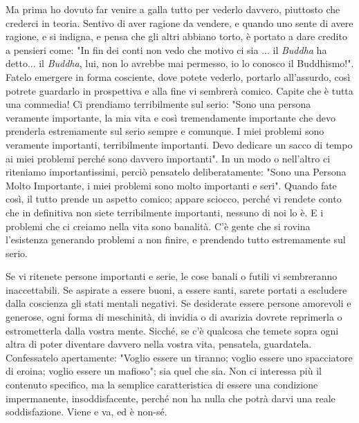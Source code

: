 Ma prima ho dovuto far venire a galla tutto per vederlo davvero,
piuttosto che crederci in teoria. Sentivo di aver ragione da vendere, e
quando uno sente di avere ragione, e si indigna, e pensa che gli altri
abbiano torto, è portato a dare credito a pensieri come: "In fin dei
conti non vedo che motivo ci sia ... il \textit{Buddha} ha detto... il \textit{Buddha},
lui, non lo avrebbe mai permesso, io lo conosco il Buddhismo!". Fatelo
emergere in forma cosciente, dove potete vederlo, portarlo all'assurdo,
così potrete guardarlo in prospettiva e alla fine vi sembrerà comico.
Capite che è tutta una commedia! Ci prendiamo terribilmente sul serio:
"Sono una persona veramente importante, la mia vita e così tremendamente
importante che devo prenderla estremamente sul serio sempre e comunque.
I miei problemi sono veramente importanti, terribilmente importanti.
Devo dedicare un sacco di tempo ai miei problemi perché sono davvero
importanti". In un modo o nell'altro ci riteniamo importantissimi,
perciò pensatelo deliberatamente: "Sono una Persona Molto Importante, i
miei problemi sono molto importanti e seri". Quando fate così, il tutto
prende un aspetto comico; appare sciocco, perché vi rendete conto che in
definitiva non siete terribilmente importanti, nessuno di noi lo è. E i
problemi che ci creiamo nella vita sono banalità. C'è gente che si
rovina l'esistenza generando problemi a non finire, e prendendo tutto
estremamente sul serio.

Se vi ritenete persone importanti e serie, le cose banali o futili vi
sembreranno inaccettabili. Se aspirate a essere buoni, a essere santi,
sarete portati a escludere dalla coscienza gli stati mentali negativi.
Se desiderate essere persone amorevoli e generose, ogni forma di
meschinità, di invidia o di avarizia dovrete reprimerla o estrometterla
dalla vostra mente. Sicché, se c'è qualcosa che temete sopra ogni altra
di poter diventare davvero nella vostra vita, pensatela, guardatela.
Confessatelo apertamente: "Voglio essere un tiranno; voglio essere uno
spacciatore di eroina; voglio essere un mafioso"; sia quel che sia. Non
ci interessa più il contenuto specifico, ma la semplice caratteristica
di essere una condizione impermanente, insoddisfacente, perché non ha
nulla che potrà darvi una reale soddisfazione. Viene e va, ed è non-sé.
